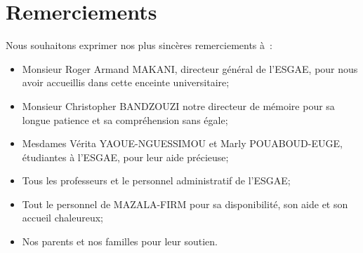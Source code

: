 \chapter*{Remerciements}

Nous souhaitons exprimer nos plus sincères remerciements à :

\begin{itemize}
  \item Monsieur Roger Armand MAKANI, directeur général de l’ESGAE,
      pour nous avoir accueillis dans cette enceinte universitaire;

  \item Monsieur Christopher BANDZOUZI notre directeur de mémoire pour sa
      longue patience et sa compréhension sans égale;

  \item Mesdames Vérita YAOUE-NGUESSIMOU et Marly POUABOUD-EUGE, étudiantes à l’ESGAE, pour
      leur aide précieuse;

  \item Tous les professeurs et le personnel administratif de l’ESGAE;


  \item
      Tout le personnel de MAZALA-FIRM pour sa disponibilité, son aide et son
      accueil chaleureux;

  \item
      Nos parents et nos familles pour leur soutien.

\end{itemize}
